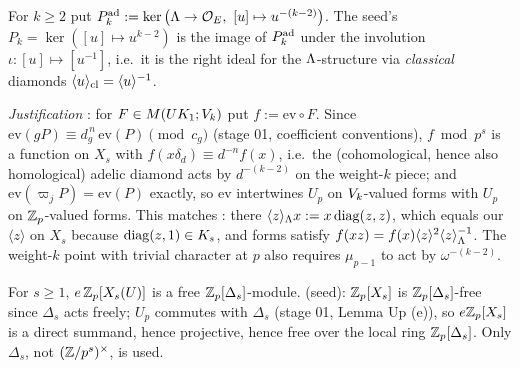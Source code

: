 \begin{definition}\label{def:s04-Pk}
For $k\ge2$ put $P^{\rm ad}_k:=\ker\big(\Lam\to\cOE,\ [u]\mapsto u^{-(k-2)}\big)$. The seed's $P_k=\ker([u]\mapsto u^{k-2})$ is the
image of $P^{\rm ad}_k$ under the involution $\iota:[u]\mapsto[u^{-1}]$, i.e.\ it is the right ideal for the $\Lambda$-structure via
\emph{classical} diamonds $\langle u\rangle_{\rm cl}=\langle u\rangle^{-1}$.
\end{definition}
\noindent\emph{Justification} \stproved: for $F\in M(UK_{1};V_k)$ put $f:=\mathrm{ev}\circ F$. Since
$\mathrm{ev}(gP)\equiv d_g^{\,n}\,\mathrm{ev}(P)\pmod{c_g}$ (stage 01, coefficient conventions), $f\bmod p^s$ is a function on $X_s$
with $f(x\delta_d)\equiv d^{-n}f(x)$, i.e.\ the (cohomological, hence also homological) adelic diamond acts by $d^{-(k-2)}$ on the
weight-$k$ piece; and $\mathrm{ev}(\varpi_jP)=\mathrm{ev}(P)$ exactly, so $\mathrm{ev}$ intertwines $U_p$ on $V_k$-valued forms with
$U_p$ on $\mathbb{Z}_p$-valued forms. This matches : there $\langle z\rangle_\Lambda x:=x\,\mathrm{diag}(z,z)$, which equals our $\langle z\rangle$ on $X_s$ because
$\mathrm{diag}(z,1)\in K_{s}$, and forms satisfy $f(xz)=f(x)\langle z\rangle^2\langle z\rangle_\Lambda^{-1}$. The weight-$k$ point with
trivial character at $p$ also requires $\mu_{p-1}$ to act by $\omega^{-(k-2)}$.

\begin{proposition}\label{prop:s04-freeA}
For $s\ge1$, $e\,\mathbb{Z}_p[X_s(U)]$ is a free $\mathbb{Z}_p[\Delta_s]$-module. \stproved{} (seed): $\mathbb{Z}_p[X_s]$ is $\mathbb{Z}_p[\Delta_s]$-free since
$\Delta_s$ acts freely; $U_p$ commutes with $\Delta_s$ (stage 01, Lemma Up (e)), so $e\mathbb{Z}_p[X_s]$ is a direct summand, hence
projective, hence free over the local ring $\mathbb{Z}_p[\Delta_s]$. Only $\Delta_s$, not $(\mathbb{Z}/p^s)^\times$, is used.
\end{proposition}

